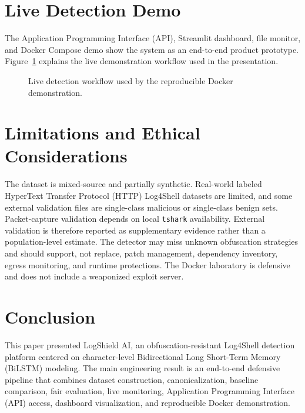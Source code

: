 \documentclass[conference]{IEEEtran}
\begin{document}
\section{Live Detection Demo}

The Application Programming Interface (API), Streamlit dashboard, file monitor,
and Docker Compose demo show the system as an end-to-end product prototype.
Figure~\ref{fig:live} explains the live demonstration workflow used in the
presentation.

\begin{figure}[!t]
\centering
{}
\caption{Live detection workflow used by the reproducible Docker demonstration.}
\label{fig:live}
\end{figure}

\section{Limitations and Ethical Considerations}

The dataset is mixed-source and partially synthetic. Real-world labeled
HyperText Transfer Protocol (HTTP)
Log4Shell datasets are limited, and some external validation files are
single-class malicious or single-class benign sets. Packet-capture validation
depends on local \texttt{tshark} availability. External validation is therefore
reported as supplementary evidence rather than a population-level estimate. The detector may
miss unknown obfuscation strategies and should support, not replace, patch
management, dependency inventory, egress monitoring, and runtime protections.
The Docker laboratory is defensive and does not include a weaponized exploit
server.

\section{Conclusion}

This paper presented LogShield AI, an obfuscation-resistant Log4Shell detection
platform centered on character-level Bidirectional Long Short-Term Memory
(BiLSTM) modeling. The main engineering result is an end-to-end defensive
pipeline that combines dataset construction, canonicalization, baseline
comparison, fair evaluation, live monitoring, Application Programming
Interface (API) access, dashboard
visualization, and reproducible Docker demonstration.
\end{document}

